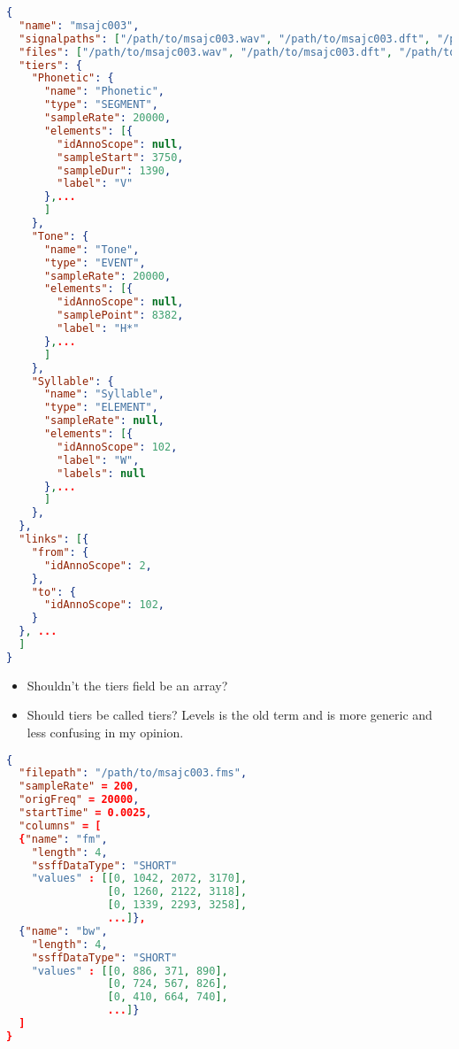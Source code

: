\documentclass[A4,12pt, utf8]{article}
\begin{document}
\begin{lstlisting}[caption=New annotation file example, label=ilr, language=json,firstnumber=1]
{
  "name": "msajc003",
  "signalpaths": ["/path/to/msajc003.wav", "/path/to/msajc003.dft", "/path/2/msajc003.fms"],
  "files": ["/path/to/msajc003.wav", "/path/to/msajc003.dft", "/path/to/msajc003.fms"],
  "tiers": {
    "Phonetic": {
      "name": "Phonetic",
      "type": "SEGMENT",
      "sampleRate": 20000,
      "elements": [{
        "idAnnoScope": null,
        "sampleStart": 3750,
        "sampleDur": 1390,
        "label": "V"
      },...
      ]
    },
    "Tone": {
      "name": "Tone",
      "type": "EVENT",
      "sampleRate": 20000,
      "elements": [{
        "idAnnoScope": null,
        "samplePoint": 8382,
        "label": "H*"
      },...
      ]
    },
    "Syllable": {
      "name": "Syllable",
      "type": "ELEMENT",
      "sampleRate": null,
      "elements": [{
        "idAnnoScope": 102,
        "label": "W",
        "labels": null
      },...
      ]
    },
  },
  "links": [{
    "from": {
      "idAnnoScope": 2,
    },
    "to": {
      "idAnnoScope": 102,
    }
  }, ...
  ]
}
\end{lstlisting}

\begin{itemize}
  \item Shouldn't the tiers field be an array?
  \item Should tiers be called tiers? Levels is the old term and is more generic and less confusing in my opinion.
\end{itemize}

\begin{lstlisting}[caption=EMU-webApp internal derived signal representation, label=idsr, language=json,firstnumber=1]
{
  "filepath": "/path/to/msajc003.fms",
  "sampleRate" = 200,
  "origFreq" = 20000,
  "startTime" = 0.0025,
  "columns" = [
  {"name": "fm",
    "length": 4,
    "ssffDataType": "SHORT"
    "values" : [[0, 1042, 2072, 3170],
                [0, 1260, 2122, 3118],
                [0, 1339, 2293, 3258],
                ...]},
  {"name": "bw",
    "length": 4,
    "ssffDataType": "SHORT"
    "values" : [[0, 886, 371, 890],
                [0, 724, 567, 826],
                [0, 410, 664, 740],
                ...]}
  ]
}
\end{lstlisting}


\end{document}
